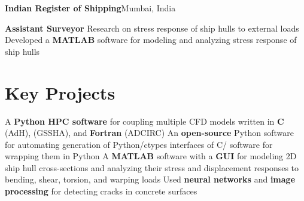 \documentclass[letterpaper,10pt]{article}
\begin{document}
    \resumeSubheading
      {\textbf{Indian Register of Shipping}}{Mumbai, India}

      \resumeSubSubheading
        {\textbf{Assistant Surveyor}}{}
        \resumeItemListStart
            {Research on stress response of ship hulls to external loads}
            {Developed a \textbf{MATLAB} software for modeling and analyzing
            stress response of ship hulls}
        \resumeItemListEnd




  \resumeSubHeadingListEnd

\section{Key Projects}
  \resumeSubItemListStart
      {A \textbf{Python HPC software} for coupling multiple CFD
      models written in \textbf{C} (AdH), \textbf{\CC{}} (GSSHA), and
      \textbf{Fortran} (ADCIRC)}
      {An \textbf{open-source} Python software for automating
      generation of Python/ctypes interfaces of C/\CC{} software for wrapping
      them in Python}
      {A \textbf{MATLAB} software with a \textbf{GUI} for modeling 2D
      ship hull cross-sections and analyzing their stress and displacement
      responses to bending, shear, torsion, and warping loads}
      {Used \textbf{neural networks} and \textbf{image processing} for detecting
      cracks in concrete surfaces}
  \resumeSubItemListEnd
\end{document}
